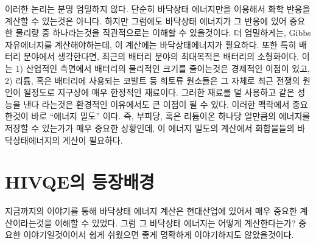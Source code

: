 \documentclass[11pt]{article}
\begin{document}
이러한 논리는 분명 엄밀하지 않다. 단순히 바닥상태 에너지만을 이용해서 화학 반응을 계산할 수 있는것은 아니다. 
하지만 그럼에도 바닥상태 에너지가 그 반응에 있어 중요한 물리량 중 하나라는것을 직관적으로는 이해할 수 있을것이다. 
더 엄밀하게는, Gibbs 자유에너지를 계산해야하는데, 이 계산에는 바닥상태에너지가 필요하다. 
또한 특히 배터리 분야에서 생각한다면, 최근의 배터리 분야의 최대목적은 배터리의 소형화이다. 
이는 1) 산업적인 측면에서 배터리의 물리적인 크기를 줄이는것은 경제적인 이점이 있고, 
2) 리튬, 혹은 배터리에 사용되는 코발트 등 희토류 원소들은 그 자체로 최근 전쟁의 원인이 될정도로 지구상에 매우 한정적인 재료이다. 
그러한 재료를 덜 사용하고 같은 성능을 낸다 라는것은 환경적인 이유에서도 큰 이점이 될 수 있다. 
이러한 맥락에서 중요한것이 바로 “에너지 밀도” 이다. 즉, 부피당, 혹은 리튬이온 하나당 얼만큼의 에너지를 저장할 수 있는가가 매우 중요한 상황인데,
 이 에너지 밀도의 계산에서 화합물들의 바닥상태에너지의 계산이 필요하다.


\section*{HIVQE의 등장배경}


지금까지의 이야기를 통해 바닥상태 에너지 계산은 현대산업에 있어서 매우 중요한 계산이라는것을 이해할 수 있었다. 그럼 그 바닥상태 에너지는 어떻게 계산한다는가? 중요한 이야기일것이어서 쉽게 쉬웠으면 좋게 명확하게 이야기하지도 않았을것이다.
\end{document}
